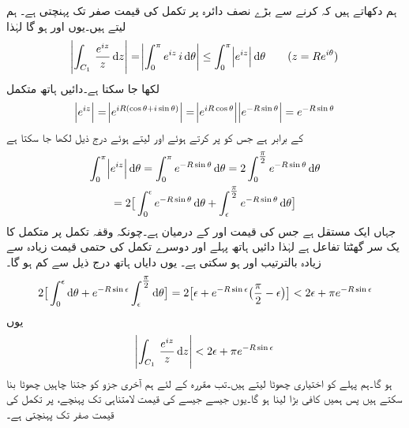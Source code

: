 ہم دکھاتے ہیں کہ  کرنے سے بڑے نصف دائرہ  پر  تکمل کی قیمت صفر تک پہنچتی ہے۔ ہم  لیتے ہیں۔یوں  اور  ہو گا لہٰذا
\begin{align*}
\abs{\int_{C_1} \,\frac{e^{iz}}{z}\dif z}=\abs{\int_0^{\pi} e^{iz} \,i\dif \theta}\le \int_0^{\pi} \abs{e^{iz}}\dif \theta\quad\quad (z=Re^{i\theta})
\end{align*}
لکھا جا سکتا ہے۔دائیں ہاتھ متکمل
\begin{align*}
\abs{e^{iz}}=\abs{e^{iR(\cos\theta+i\sin\theta)}}=\abs{e^{iR\cos\theta}}\abs{e^{-R\sin\theta}}=e^{-R\sin\theta}
\end{align*}
کے برابر ہے جس کو پر کرتے ہوئے اور   لیتے ہوئے درج ذیل لکھا جا سکتا ہے
\begin{multline*}
\int_0^{\pi}\abs{e^{iz}}\dif\theta=\int_0^{\pi} e^{-R\sin\theta}\dif\theta=2\int_0^{\tfrac{\pi}{2}} e^{-R\sin\theta}\dif\theta\\
=2\big[\int_0^{\epsilon} e^{-R\sin\theta}\dif \theta+\int_{\epsilon}^{\tfrac{\pi}{2}}e^{-R\sin\theta}\dif \theta\big]
\end{multline*}
جہاں  ایک مستقل ہے جس کی قیمت  اور   کے درمیان ہے۔چونکہ وقفہ تکمل پر متکمل  کا یک سر گھٹتا تفاعل ہے لہٰذا دائیں ہاتھ پہلے اور دوسرے تکمل کی حتمی قیمت زیادہ سے زیادہ  بالترتیب  اور  ہو سکتی ہے۔ یوں دایاں ہاتھ درج ذیل سے کم ہو گا۔
\begin{align*}
2\big[\int_0^{\epsilon} \dif \theta+e^{-R\sin\epsilon}\int_{\epsilon}^{\tfrac{\pi}{2}} \dif\theta\big]=2\big[\epsilon+e^{-R\sin\epsilon}\big(\frac{\pi}{2}-\epsilon\big)\big]<2\epsilon+\pi e^{-R\sin\epsilon}
\end{align*}
یوں
\begin{align*}
\abs{\int_{C_1} \,\frac{e^{iz}}{z}\dif z}<2\epsilon+\pi e^{-R\sin\epsilon}
\end{align*}
ہو گا۔ہم پہلے  کو اختیاری چھوٹا لیتے ہیں۔تب مقررہ  کے لئے ہم آخری جزو  کو جتنا چاہیں چھوٹا بنا سکتے ہیں پس ہمیں  کافی بڑا لینا ہو گا۔یوں  جیسے جیسے  کی قیمت لامتناہی تک پہنچے،  پر تکمل کی قیمت صفر تک پہنچتی ہے۔

